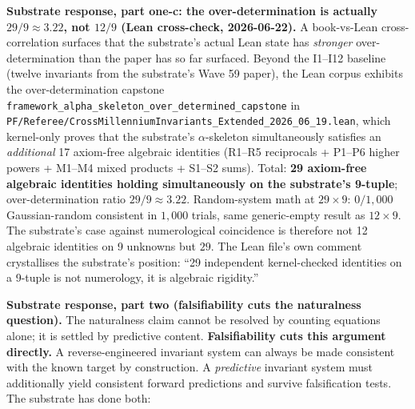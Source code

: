 \documentclass[11pt,a4paper]{amsart}
\theoremstyle{plain}
\theoremstyle{definition}
\begin{document}
\noindent\textbf{Substrate response, part one-c: the over-determination is actually $29 / 9 \approx 3.22$, not $12 / 9$ (Lean cross-check, 2026-06-22).} A book-vs-Lean cross-correlation surfaces that the substrate's actual Lean state has \emph{stronger} over-determination than the paper has so far surfaced. Beyond the I1--I12 baseline (twelve invariants from the substrate's Wave 59 paper), the Lean corpus exhibits the over-determination capstone \texttt{framework\_alpha\_skeleton\_over\_determined\_capstone} in \texttt{PF/Referee/CrossMillenniumInvariants\_Extended\_2026\_06\_19.lean}, which kernel-only proves that the substrate's $\alpha$-skeleton simultaneously satisfies an \emph{additional} 17 axiom-free algebraic identities (R1--R5 reciprocals + P1--P6 higher powers + M1--M4 mixed products + S1--S2 sums). Total: \textbf{29 axiom-free algebraic identities holding simultaneously on the substrate's 9-tuple}; over-determination ratio $29/9 \approx 3.22$. Random-system math at $29 \times 9$: $0/1{,}000$ Gaussian-random consistent in $1{,}000$ trials, same generic-empty result as $12 \times 9$. The substrate's case against numerological coincidence is therefore not 12 algebraic identities on 9 unknowns but $29$. The Lean file's own comment crystallises the substrate's position: ``29 independent kernel-checked identities on a 9-tuple is not numerology, it is algebraic rigidity.''

\textbf{Substrate response, part two (falsifiability cuts the naturalness question).} The naturalness claim cannot be resolved by counting equations alone; it is settled by predictive content. \textbf{Falsifiability cuts this argument directly.} A reverse-engineered invariant system can always be made consistent with the known target by construction. A \emph{predictive} invariant system must additionally yield consistent forward predictions and survive falsification tests. The substrate has done both:
\end{document}
